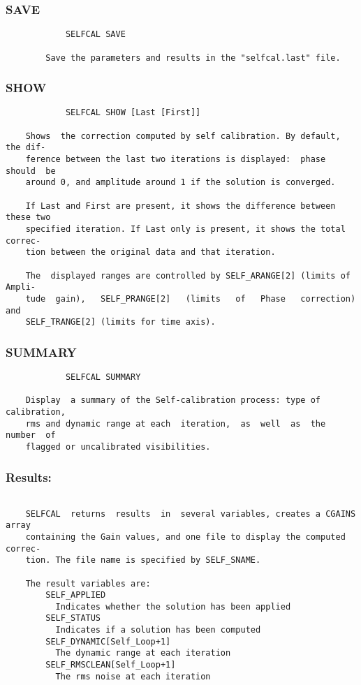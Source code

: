 \subsubsection{SAVE}
\begin{verbatim}
            SELFCAL SAVE

        Save the parameters and results in the "selfcal.last" file.

\end{verbatim}
\subsubsection{SHOW}
\begin{verbatim}
            SELFCAL SHOW [Last [First]]

    Shows  the correction computed by self calibration. By default, the dif-
    ference between the last two iterations is displayed:  phase  should  be
    around 0, and amplitude around 1 if the solution is converged.

    If Last and First are present, it shows the difference between these two
    specified iteration. If Last only is present, it shows the total correc-
    tion between the original data and that iteration.

    The  displayed ranges are controlled by SELF_ARANGE[2] (limits of Ampli-
    tude  gain),   SELF_PRANGE[2]   (limits   of   Phase   correction)   and
    SELF_TRANGE[2] (limits for time axis).

\end{verbatim}
\subsubsection{SUMMARY}
\begin{verbatim}
            SELFCAL SUMMARY

    Display  a summary of the Self-calibration process: type of calibration,
    rms and dynamic range at each  iteration,  as  well  as  the  number  of
    flagged or uncalibrated visibilities.

\end{verbatim}
\subsubsection{Results:}
\begin{verbatim}

    SELFCAL  returns  results  in  several variables, creates a CGAINS array
    containing the Gain values, and one file to display the computed correc-
    tion. The file name is specified by SELF_SNAME.

    The result variables are:
        SELF_APPLIED
          Indicates whether the solution has been applied
        SELF_STATUS
          Indicates if a solution has been computed
        SELF_DYNAMIC[Self_Loop+1]
          The dynamic range at each iteration
        SELF_RMSCLEAN[Self_Loop+1]
          The rms noise at each iteration
\end{verbatim}
